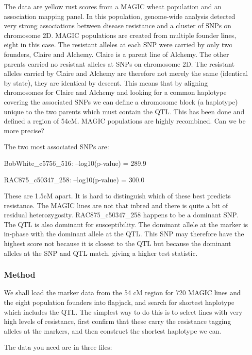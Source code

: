 \documentclass[
]{book}
\begin{document}
The data are yellow rust scores from a MAGIC wheat population and an association mapping panel. In this population, genome-wide analysis detected very strong associations between disease resistance and a cluster of SNPs on chromosome 2D. MAGIC populations are created from multiple founder lines, eight in this case. The resistant alleles at each SNP were carried by only two founders, Claire and Alchemy. Claire is a parent line of Alchemy. The other parents carried no resistant alleles at SNPs on chromosome 2D. The resistant alleles carried by Claire and Alchemy are therefore not merely the same (identical by state), they are identical by descent. This means that by aligning chromosomes for Claire and Alchemy and looking for a common haplotype covering the associated SNPs we can define a chromosome block (a haplotype) unique to the two parents which must contain the QTL. This has been done and defined a region of 54cM. MAGIC populations are highly recombined. Can we be more precise?

The two most associated SNPs are:

BobWhite\_c5756\_516: --log10(p-value) = 289.9

RAC875\_c50347\_258: --log10(p-value) = 300.0

These are 1.5cM apart. It is hard to distinguish which of these best predicts resistance. The MAGIC lines are not that inbred and there is quite a bit of residual heterozygosity. RAC875\_c50347\_258 happens to be a dominant SNP. The QTL is also dominant for susceptibility. The dominant allele at the marker is in-phase with the dominant allele at the QTL. This SNP may therefore have the highest score not because it is closest to the QTL but because the dominant alleles at the SNP and QTL match, giving a higher test statistic.

\hypertarget{method}{%
\subsubsection{Method}\label{method}}

We shall load the marker data from the 54 cM region for 720 MAGIC lines and the eight population founders into flapjack, and search for shortest haplotype which includes the QTL. The simplest way to do this is to select lines with very high levels of resistance, first confirm that these carry the resistance tagging alleles at the markers, and then construct the shortest haplotype we can.

The data you need are in three files:
\end{document}
